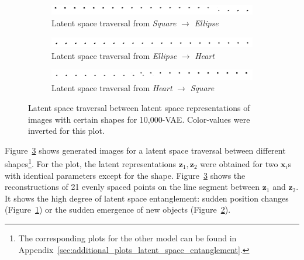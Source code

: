 \begin{figure}
    \centering
    \begin{subfigure}{\textwidth}
        \centering
        \includegraphics[width=\textwidth]{images/latent_space_entanglement/vae_10000_traverse_square_ellipse.png}
        \caption{Latent space traversal from \textit{Square} $\rightarrow$ \textit{Ellipse}}
        \label{subfig:10000_vae_latent_space_traversal_square_to_ellipse}
    \end{subfigure}
    \begin{subfigure}{\textwidth}
        \centering
        \includegraphics[width=\textwidth]{images/latent_space_entanglement/vae_10000_traverse_ellipse_heart.png}
        \caption{Latent space traversal from \textit{Ellipse} $\rightarrow$ \textit{Heart}}
    \end{subfigure}
    \begin{subfigure}{\textwidth}
        \centering
        \includegraphics[width=\textwidth]{images/latent_space_entanglement/vae_10000_traverse_heart_square.png}
        \caption{Latent space traversal from \textit{Heart} $\rightarrow$ \textit{Square}}
        \label{subfig:10000_vae_latent_space_traversal_heart_to_square}
    \end{subfigure}
    \caption[VAE Latent Space Traversal - dsprites]{Latent space traversal between latent space representations of images with certain shapes for 10,000-\ac{VAE}. Color-values were inverted for this plot.}
    \label{fig:10000_vae_latent_space_traversal_shape_to_shape}
\end{figure}

Figure~\ref{fig:10000_vae_latent_space_traversal_shape_to_shape} shows generated images for a latent space traversal between different shapes\footnote{The corresponding plots for the other model can be found in Appendix~\ref{sec:additional_plots_latent_space_entanglement}.}.
For the plot, the latent representations $\bm{z}_1, \bm{z}_2$ were obtained for two $\bm{x}_i$s with identical parameters except for the shape.
Figure~\ref{fig:10000_vae_latent_space_traversal_shape_to_shape} shows the reconstructions of 21 evenly spaced points on the line segment between $\bm{z}_1$ and $\bm{z}_2$.
It shows the high degree of latent space entanglement: sudden position changes (Figure~\ref{subfig:10000_vae_latent_space_traversal_square_to_ellipse}) or the sudden emergence of new objects (Figure~\ref{subfig:10000_vae_latent_space_traversal_heart_to_square}).

